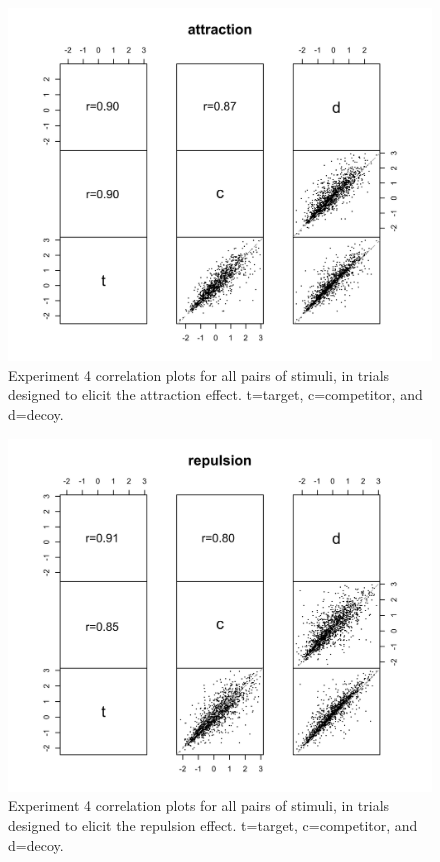\begin{figure}
    \centering
    \includegraphics[scale=.5,width=120mm]{figures/price_z_corplot_attraction.jpeg}
    \caption{Experiment 4 correlation plots for all pairs of stimuli, in trials designed to elicit the attraction effect. t=target, c=competitor, and d=decoy.}
    \label{fig:price_z_corplot_attraction}
\end{figure}

\begin{figure}
    \centering
    \includegraphics[scale=.5,width=120mm]{figures/price_z_corplot_repulsion.jpeg}
    \caption{Experiment 4 correlation plots for all pairs of stimuli, in trials designed to elicit the repulsion effect. t=target, c=competitor, and d=decoy.}
    \label{fig:price_z_corplot_repulsion}
\end{figure}

